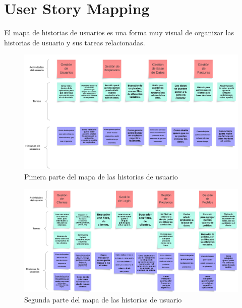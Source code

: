 \chapter{User Story Mapping}

El mapa de historias de usuarios es una forma muy visual de organizar las historias de usuario y sus tareas relacionadas.

\begin{figure}[h]
    \centering
    \includegraphics[width=1\textwidth]{figures/mapa-historias-usuarios-1.png}
    \caption{Pimera parte del mapa de las historias de usuario}
    \label{fig:user-story-mapping-1}
\end{figure}

\begin{figure}[h]
    \centering
    \includegraphics[width=1\textwidth]{figures/mapa-historias-usuarios-2.png}
    \caption{Segunda parte del mapa de las historias de usuario}
    \label{fig:user-story-mapping-2}
\end{figure}
